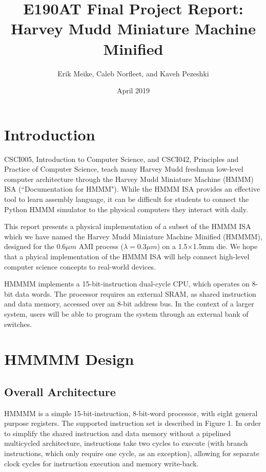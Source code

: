 \documentclass[12pt]{article}
\title{E190AT Final Project Report:\\%
       \textbf{Harvey Mudd Miniature Machine Minified}}
\author{Erik Meike, Caleb Norfleet, and Kaveh Pezeshki }
\date{April 2019}
\begin{document}
\maketitle
\thispagestyle{empty}
\clearpage
{}

\section{Introduction}

CSCI005, Introduction to Computer Science, and CSCI042, Principles and Practice of Computer Science, teach many Harvey Mudd freshman low-level computer architecture through the Harvey Mudd Miniature Machine (HMMM) ISA (``Documentation for HMMM"). While the HMMM ISA provides an effective tool to learn assembly language, it can be difficult for students to connect the Python HMMM simulator to the physical computers they interact with daily.

This report presents a physical implementation of a subset of the HMMM ISA which we have named the Harvey Mudd Miniature Machine Minified (HMMMM), designed for the 0.6$\mu m$ AMI process ($\lambda=0.3\mu m$) on a 1.5$\times$1.5mm die. We hope that a phyical implementation of the HMMM ISA will help connect high-level computer science concepts to real-world devices.

HMMMM implements a 15-bit-instruction dual-cycle CPU, which operates on 8-bit data words. The processor requires an external SRAM, as shared instruction and data memory, accessed over an 8-bit address bus. In the context of a larger system, users will be able to program the system through an external bank of switches.

\section{HMMMM Design}

\subsection{Overall Architecture}

HMMMM is a simple 15-bit-instruction, 8-bit-word processor, with eight general purpose registers. The supported instruction set is described in Figure 1. In order to simplify the shared instruction and data memory without a pipelined multicycled architecture, instructions take two cycles to execute (with branch instructions, which only require one cycle, as an exception), allowing for separate clock cycles for instruction execution and memory write-back.
\end{document}
